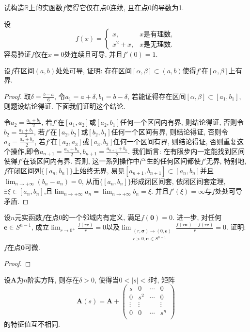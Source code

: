 \begin{quizb}
\woe 试构造\(\mathbb{R}\)上的实函数\(f\)使得它仅在点\(0\)连续, 且在点0的导数为1.
\begin{solution}
设\[f(x)=\begin{cases}
x,\quad &x\text{是有理数},\\
x^2+x,&x\text{是无理数}.
\end{cases}\]容易验证\(f\)仅在\(x=0\)处连续且可导, 并且\(f'(0)=1\).
\end{solution}
\woe 设\(f\)在区间\((a,b)\)处处可导, 证明: 存在区间\([\alpha,\beta]\subset (a,b)\)使得\(f'\)在\([\alpha,\beta]\)上有界.
\begin{proof}
取\(\delta=\frac{b-a}{6}\), 令\(a_1=a+\delta,b_1=b-\delta\), 若能证得存在区间\([\alpha,\beta]\subset[a_1,b_1]\), 则题设结论得证. 下面我们证明这个结论.

令\(a_2=\frac{a_1+b_1}{2}\), 若\(f'\)在\([a_1,a_2]\)或\([a_2,b_1]\)任何一个区间内有界, 则结论得证, 否则令\(b_2=\frac{a_2+b_1}{2}\), 若\(f'\)在\([a_2,b_2]\)或\([b_2,b_1]\)任何一个区间有界, 则结论得证, 否则令\(a_3=\frac{a_2+b_2}{2}\), 若\(f'\)在\([a_2,a_3]\)或\([a_3,b_2]\)任何一个区间有界, 则结论得证, 否则重复这个操作,即令\(a_{n+1}=\frac{a_n+b_n}{2},b_{n+1}=\frac{a_{n+1}+b_n}{2}\). 我们断言: 在有限步内一定能找到区间使得\(f'\)在该区间内有界. 否则, 这一系列操作中产生的任何区间都使\(f'\)无界, 特别地, \(f\)在闭区间列\(\{[a_n,b_n]\}\)上始终无界, 易见\([a_{n+1},b_{n+1}]\subset [a_n,b_n]\)并且\(\lim_{n\rightarrow+\infty}\left(b_n-a_n\right)=0\), 从而\(\{[a_n,b_n]\}\)形成闭区间套, 依闭区间套定理, \(\exists\xi\in[a_n,b_n]\),且\(\lim_{n\rightarrow+\infty}a_n=\lim_{n\rightarrow+\infty}b_n=\xi\).  并且\(f'(\xi)=\infty\)与\(f\)处处可导矛盾.
\end{proof}
\woe 设\(n\)元实函数\(f\)在点\(0\)的一个邻域内有定义, 满足\(f(\boldsymbol{0})=0\). 进一步, 对任何\(\boldsymbol{e}\in S^{n-1}\), 成立\(\lim_{r\rightarrow 0^+}\frac{f(r\boldsymbol{e})}{r}=0\)以及\(\lim_{\substack{(r,\boldsymbol{\sigma})\rightarrow (0,\boldsymbol{e})\\ r>0,\boldsymbol{\sigma}\in S^{n-1}}}\frac{f(r\boldsymbol{\sigma})-f(r\boldsymbol{e})}{r}=0\). 证明: \(f\)在点\(\boldsymbol{0}\)可微.
\begin{proof}
	
\end{proof}
\woe 设\(\boldsymbol{A}\)为\(n\)阶实方阵, 则存在\(\delta>0\), 使得当\(0<|s|<\delta\)时, 矩阵\[\boldsymbol{A}(s)=\boldsymbol{A}+\left(\begin{matrix}
    s&0&\cdots&0\\0&s^2&\cdots&0\\\vdots&\vdots&&\vdots\\0&0&\cdots&s^n\\
\end{matrix}\right)\]的特征值互不相同.


\end{quizb}

